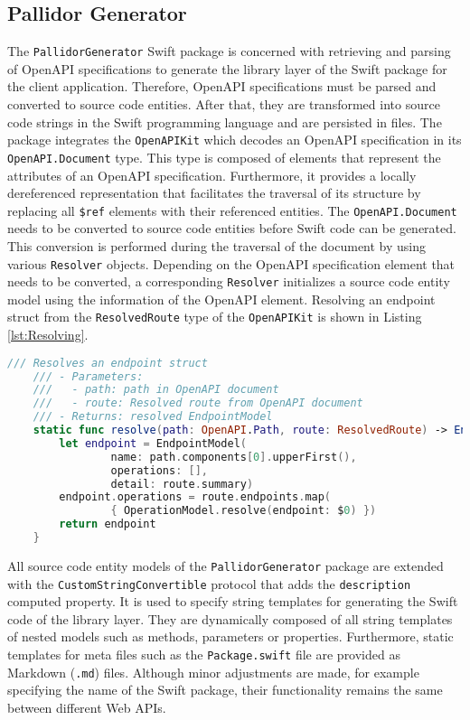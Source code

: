 \subsection{Pallidor Generator}\label{subsec:PallidorGenerator}

The \texttt{PallidorGenerator} Swift package is concerned with retrieving and parsing of OpenAPI specifications to generate the library layer of the Swift package for the client application. Therefore, OpenAPI specifications must be parsed and converted to source code entities. After that, they are transformed into source code strings in the Swift programming language and are persisted in files. The package integrates the \texttt{OpenAPIKit} which decodes an OpenAPI specification in its \texttt{Open\-API.Document} type. This type is composed of elements that represent the attributes of an OpenAPI specification. Furthermore, it provides a locally dereferenced representation that facilitates the traversal of its structure by replacing all \texttt{\$ref} elements with their referenced entities. The \texttt{OpenAPI.Document} needs to be converted to source code entities before Swift code can be generated. This conversion is performed during the traversal of the document by using various \texttt{Resolver} objects. Depending on the OpenAPI specification element that needs to be converted, a corresponding \texttt{Resolver} initializes a source code entity model using the information of the OpenAPI element. Resolving an endpoint struct from the \texttt{Resolved\-Route} type of the \texttt{OpenAPIKit} is shown in Listing \ref{lst:Resolving}.

\begin{lstlisting}[language=Swift, caption={Resolving an operation}, captionpos=b, label={lst:Resolving}]
	/// Resolves an endpoint struct
	/// - Parameters:
	///   - path: path in OpenAPI document
	///   - route: Resolved route from OpenAPI document
	/// - Returns: resolved EndpointModel
	static func resolve(path: OpenAPI.Path, route: ResolvedRoute) -> EndpointModel {
		let endpoint = EndpointModel(
				name: path.components[0].upperFirst(), 
				operations: [], 
				detail: route.summary)
		endpoint.operations = route.endpoints.map( 
				{ OperationModel.resolve(endpoint: $0) })
		return endpoint
	}

\end{lstlisting}

All source code entity models of the \texttt{PallidorGenerator} package are extended with the \texttt{Custom\-String\-Convertible} protocol that adds the \texttt{description} computed property. It is used to specify string templates for generating the Swift code of the library layer. They are dynamically composed of all string templates of nested models such as methods, parameters or properties. Furthermore, static templates for meta files such as the \texttt{Package.swift} file are provided as Markdown (\texttt{.md}) files. Although minor adjustments are made, for example specifying the name of the Swift package, their functionality remains the same between different Web APIs.

